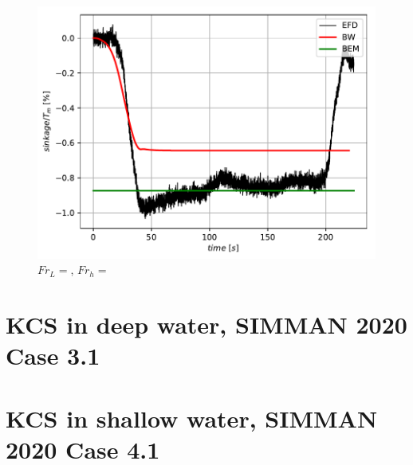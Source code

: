 \documentclass[]{book}
\begin{document}
\begin{figure}
	\centering
	\includegraphics[width=0.9\linewidth]{figures/Example04_MASHCON2019_DTC_C3_Sinkage}
	\caption{$Fr_L = $, $Fr_h = $}
	\label{fig:example04mashcon2019dtcc1sinkage}
\end{figure}


\section{KCS in deep water, SIMMAN 2020 Case 3.1}
\section{KCS in shallow water, SIMMAN 2020 Case 4.1}
\end{document}
